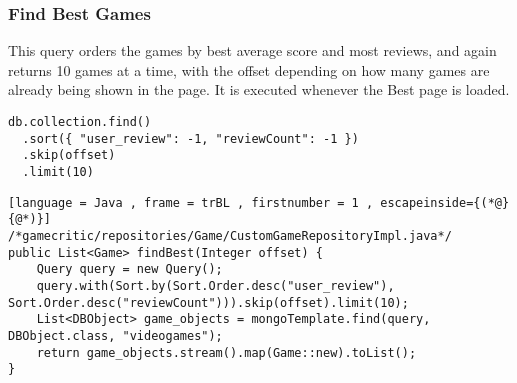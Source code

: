 \subsubsection{Find Best Games}
This query orders the games by best average score and most reviews, and again returns 10 games at a time, with the offset depending on how many games are already being shown in the page.
It is executed whenever the Best page is loaded.
\begin{Verbatim}[fontsize=\footnotesize]
db.collection.find()
  .sort({ "user_review": -1, "reviewCount": -1 })
  .skip(offset)
  .limit(10)
\end{Verbatim}
\begin{lstlisting}[language = Java , frame = trBL , firstnumber = 1 , escapeinside={(*@}{@*)}]
/*gamecritic/repositories/Game/CustomGameRepositoryImpl.java*/
public List<Game> findBest(Integer offset) {
    Query query = new Query();
    query.with(Sort.by(Sort.Order.desc("user_review"), Sort.Order.desc("reviewCount"))).skip(offset).limit(10);
    List<DBObject> game_objects = mongoTemplate.find(query, DBObject.class, "videogames");
    return game_objects.stream().map(Game::new).toList();
}
\end{lstlisting}

